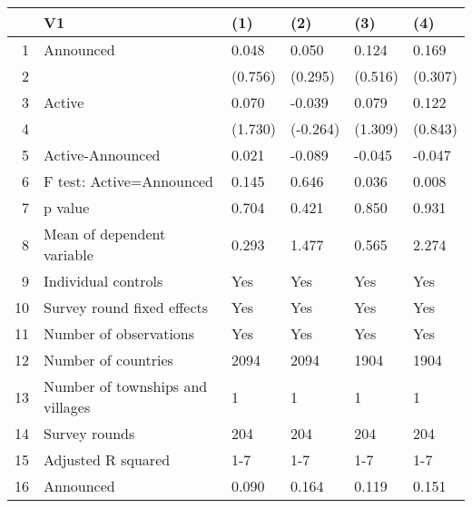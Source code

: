 \begin{table}[ht]
\centering
\begin{tabular}{rlllll}
  \hline
 & V1 & (1) & (2) & (3) & (4) \\ 
  \hline
1 & Announced & 0.048 & 0.050 & 0.124 & 0.169 \\ 
  2 &  & (0.756) & (0.295) & (0.516) & (0.307) \\ 
  3 & Active & 0.070 & -0.039 & 0.079 & 0.122 \\ 
  4 &  & (1.730) & (-0.264) & (1.309) & (0.843) \\ 
  5 & Active-Announced & 0.021 & -0.089 & -0.045 & -0.047 \\ 
  6 & F test: Active=Announced & 0.145 & 0.646 & 0.036 & 0.008 \\ 
  7 & p value & 0.704 & 0.421 & 0.850 & 0.931 \\ 
  8 & Mean of dependent variable & 0.293 & 1.477 & 0.565 & 2.274 \\ 
  9 & Individual controls & Yes & Yes & Yes & Yes \\ 
  10 & Survey round fixed effects & Yes & Yes & Yes & Yes \\ 
  11 & Number of observations & Yes & Yes & Yes & Yes \\ 
  12 & Number of countries & 2094 & 2094 & 1904 & 1904 \\ 
  13 & Number of townships and villages & 1 & 1 & 1 & 1 \\ 
  14 & Survey rounds & 204 & 204 & 204 & 204 \\ 
  15 & Adjusted R squared & 1-7 & 1-7 & 1-7 & 1-7 \\ 
  16 & Announced & 0.090 & 0.164 & 0.119 & 0.151 \\ 
   \hline
\end{tabular}
\end{table}
